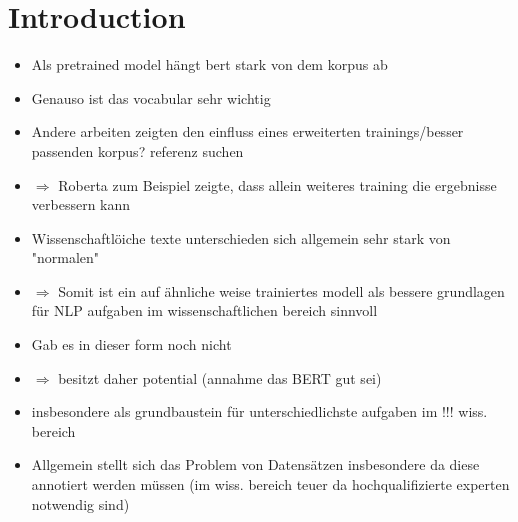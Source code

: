 \chapter{Introduction}
\begin{itemize}
	\item Als pretrained model hängt bert stark von dem korpus ab
	\item Genauso ist das vocabular sehr wichtig
	\item Andere arbeiten zeigten den einfluss eines erweiterten trainings/besser passenden korpus? referenz suchen
	\item $\Longrightarrow$ Roberta zum Beispiel zeigte, dass allein weiteres training die ergebnisse verbessern kann
	\item Wissenschaftlöiche texte unterschieden sich allgemein sehr stark von "normalen"
	\item $\Rightarrow$ Somit ist ein auf ähnliche weise trainiertes modell als bessere grundlagen für NLP aufgaben im wissenschaftlichen bereich sinnvoll
	\item Gab es in dieser form noch nicht
	\item $\Rightarrow$ besitzt daher potential (annahme das BERT gut sei)
	\item insbesondere als grundbaustein für unterschiedlichste aufgaben im !!! wiss. bereich
	\item Allgemein stellt sich das Problem von Datensätzen insbesondere da diese annotiert werden müssen (im wiss. bereich teuer da hochqualifizierte experten notwendig sind)
\end{itemize}